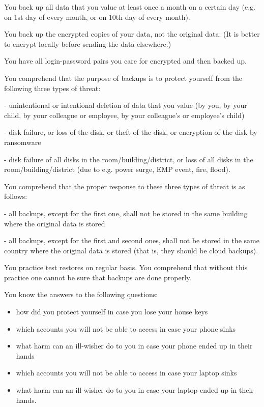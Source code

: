 \documentclass[11pt]{article}
\theoremstyle{remark}
\theoremstyle{definition}
\begin{document}
You back up all data that you value at least once a month on a certain day (e.g. on 1st day of every month, or on 10th day of every month). 

You back up the encrypted copies of your data, not the original data. (It is better to encrypt locally before sending the data elsewhere.)

You have all login-password pairs you care for encrypted and then backed up. 

You comprehend that the purpose of backups is to protect yourself from the following three types of threat:

- unintentional or intentional deletion of data that you value (by you, by your child, by your colleague or employee, by your colleague's or employee's child)

- disk failure, or loss of the disk, or theft of the disk, or encryption of the disk by ransomware 

- disk failure of all disks in the room/building/district, or loss of all disks in the room/building/district (due to e.g. power surge, EMP event, fire, flood).


You comprehend that the proper response to these three types of threat is as follows:

- all backups, except for the first one, shall not be stored in the same building where the original data is stored

- all backups, except for the first and second ones, shall not be stored in the same country where the original data is stored (that is, they should be cloud backups).


You practice test restores on regular basis. You comprehend that without this practice one cannot be sure that backups are done properly.



You know the answers to the following questions:

\begin{itemize}
\item how did you protect yourself in case you lose your house keys
\item which accounts you will not be able to access in case your phone sinks
\item what harm can an ill-wisher do to you in case your phone ended up in their hands
\item which accounts you will not be able to access in case your laptop sinks
\item what harm can an ill-wisher do to you in case your laptop ended up in their hands.
\end{itemize}
\end{document}
